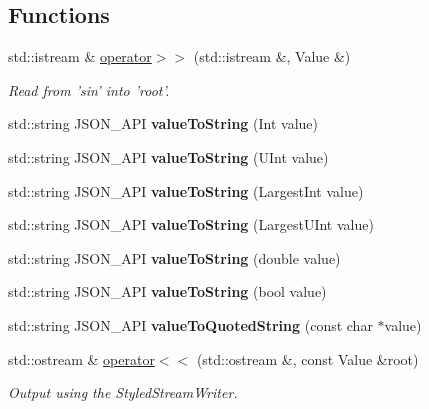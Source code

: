\subsection*{Functions}
\begin{DoxyCompactItemize}
\item 
std\-::istream \& \hyperlink{namespace_json_a4d245ef719cc0853e8e78eb5f99c16e5}{operator$>$$>$} (std\-::istream \&, Value \&)
\begin{DoxyCompactList}\small\item\em Read from 'sin' into 'root'. \end{DoxyCompactList}\item 
\hypertarget{namespace_json_a5d3eba6789f9a9c1ab563ff8b4a5090f}{std\-::string J\-S\-O\-N\-\_\-\-A\-P\-I {\bfseries value\-To\-String} (Int value)}\label{namespace_json_a5d3eba6789f9a9c1ab563ff8b4a5090f}

\item 
\hypertarget{namespace_json_a4d43b0ff222bd3975bcf1babca0b978f}{std\-::string J\-S\-O\-N\-\_\-\-A\-P\-I {\bfseries value\-To\-String} (U\-Int value)}\label{namespace_json_a4d43b0ff222bd3975bcf1babca0b978f}

\item 
\hypertarget{namespace_json_abd9c650f70d9434f98f9025e2e2faf2d}{std\-::string J\-S\-O\-N\-\_\-\-A\-P\-I {\bfseries value\-To\-String} (Largest\-Int value)}\label{namespace_json_abd9c650f70d9434f98f9025e2e2faf2d}

\item 
\hypertarget{namespace_json_a3f46b0bc62b95a9426a2da0117bdf9f0}{std\-::string J\-S\-O\-N\-\_\-\-A\-P\-I {\bfseries value\-To\-String} (Largest\-U\-Int value)}\label{namespace_json_a3f46b0bc62b95a9426a2da0117bdf9f0}

\item 
\hypertarget{namespace_json_a99995d7dafa4f4970b349d7d3c8d1d99}{std\-::string J\-S\-O\-N\-\_\-\-A\-P\-I {\bfseries value\-To\-String} (double value)}\label{namespace_json_a99995d7dafa4f4970b349d7d3c8d1d99}

\item 
\hypertarget{namespace_json_a979ed531f091985e22f0051cd2a8e341}{std\-::string J\-S\-O\-N\-\_\-\-A\-P\-I {\bfseries value\-To\-String} (bool value)}\label{namespace_json_a979ed531f091985e22f0051cd2a8e341}

\item 
\hypertarget{namespace_json_aa0c8235a4a5c6599da5d3332743db8ac}{std\-::string J\-S\-O\-N\-\_\-\-A\-P\-I {\bfseries value\-To\-Quoted\-String} (const char $\ast$value)}\label{namespace_json_aa0c8235a4a5c6599da5d3332743db8ac}

\item 
std\-::ostream \& \hyperlink{namespace_json_a87bc83d7e90fc666d28aa16727deda2f}{operator$<$$<$} (std\-::ostream \&, const Value \&root)
\begin{DoxyCompactList}\small\item\em Output using the Styled\-Stream\-Writer. \end{DoxyCompactList}\end{DoxyCompactItemize}


